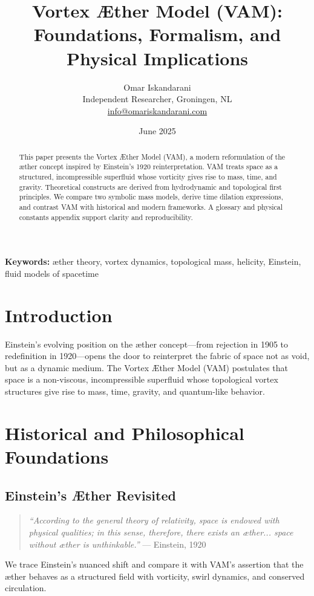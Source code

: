 \documentclass[12pt]{article}
\title{Vortex Æther Model (VAM): Foundations, Formalism, and Physical Implications}
\author{Omar Iskandarani \\ Independent Researcher, Groningen, NL \\ \href{mailto:info@omariskandarani.com}{info@omariskandarani.com}}
\date{June 2025}
\begin{document}
    \maketitle

    \begin{abstract}
        This paper presents the Vortex Æther Model (VAM), a modern reformulation of the æther concept inspired by Einstein’s 1920 reinterpretation. VAM treats space as a structured, incompressible superfluid whose vorticity gives rise to mass, time, and gravity. Theoretical constructs are derived from hydrodynamic and topological first principles. We compare two symbolic mass models, derive time dilation expressions, and contrast VAM with historical and modern frameworks. A glossary and physical constants appendix support clarity and reproducibility.
    \end{abstract}

    \vspace{0.5cm}
    \textbf{Keywords:} æther theory, vortex dynamics, topological mass, helicity, Einstein, fluid models of spacetime

    \newpage
    \tableofcontents
    \newpage

    \section{Introduction}
    Einstein's evolving position on the æther concept—from rejection in 1905 to redefinition in 1920—opens the door to reinterpret the fabric of space not as void, but as a dynamic medium. The Vortex Æther Model (VAM) postulates that space is a non-viscous, incompressible superfluid whose topological vortex structures give rise to mass, time, gravity, and quantum-like behavior.

    \section{Historical and Philosophical Foundations}
    \subsection{Einstein's Æther Revisited}
    \begin{quote}
        \textit{“According to the general theory of relativity, space is endowed with physical qualities; in this sense, therefore, there exists an æther... space without æther is unthinkable.”} — Einstein, 1920
    \end{quote}
    We trace Einstein’s nuanced shift and compare it with VAM’s assertion that the æther behaves as a structured field with vorticity, swirl dynamics, and conserved circulation.
\end{document}
